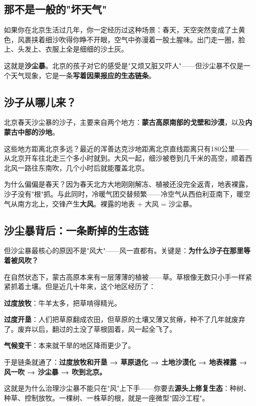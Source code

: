 \documentclass[a4paper,12pt]{ctexart}
\begin{document}
\subsection*{那不是一般的"坏天气"}

如果你在北京生活过几年，你一定经历过这种场景：春天，天空突然变成了土黄色，风裹挟着细沙吹得你睁不开眼，空气中弥漫着一股土腥味。出门走一圈，脸上、头发上、衣服上全是细细的沙土灰。

这就是\textbf{沙尘暴}。北京的孩子对它的感受是"又烦又脏又吓人"——但沙尘暴不仅是一个天气现象，它是一条\textbf{写着因果报应的生态链条}。

\subsection*{沙子从哪儿来？}

北京春天沙尘暴的沙子，主要来自两个地方：\textbf{蒙古高原南部的戈壁和沙漠}，以及\textbf{内蒙古中部的沙地}。

这些地方距离北京多远？最近的浑善达克沙地距离北京直线距离只有180公里——从北京开车往北走三个多小时就到。大风一起，细沙被卷到几千米的高空，顺着西北风一路往东南吹，几个小时后就能覆盖北京。

为什么偏偏是春天？因为春天北方大地刚刚解冻、植被还没完全返青，地表裸露，沙子没有"根"抓。与此同时，冷暖气团交替频繁——冷空气从西伯利亚南下，暖空气从南方北上，交锋产生\textbf{大风}。裸露的地表 + 大风 = 沙尘暴。

\subsection*{沙尘暴背后：一条断掉的生态链}

但沙尘暴最核心的原因不是"风大"——风一直都有。关键是：\textbf{为什么沙子在那里等着被风吹？}

在自然状态下，蒙古高原本来有一层薄薄的植被——草。草根像无数只小手一样紧紧抓着土壤。但是近几十年来，这个地区经历了：

\textbf{过度放牧}：牛羊太多，把草啃得精光。

\textbf{过度开垦}：人们把草原翻成农田，但草原的土壤又薄又贫瘠，种不了几年就废弃了。废弃以后，翻过的土没了草根固着，风一起全飞了。

\textbf{气候变干}：本来就干旱的地区降雨更少了。

于是链条就通了：\textbf{过度放牧和开垦 → 草原退化 → 土地沙漠化 → 地表裸露 → 风一吹 → 沙尘暴 → 吹到北京。}

这就是为什么治理沙尘暴不能只在"风"上下手——你要去\textbf{源头上修复生态}：种树、种草、控制放牧。一棵树、一株草的根，就是一座微型"固沙工程"。
\end{document}
